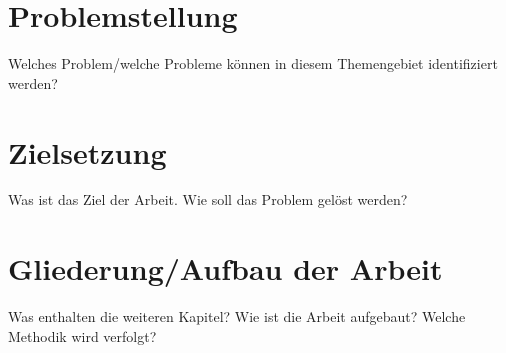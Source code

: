 \section{Problemstellung}
\label{ch:Einleitung:sec:Problemstellung}

Welches Problem/welche Probleme können in diesem Themengebiet identifiziert werden?

\section{Zielsetzung}
\label{ch:Einleitung:sec:Zielsetzung}

Was ist das Ziel der Arbeit. Wie soll das Problem gelöst werden?


\section{Gliederung/Aufbau der Arbeit}
\label{ch:Einleitung:sec:Gliederung}

Was enthalten die weiteren Kapitel? Wie ist die Arbeit aufgebaut? Welche Methodik wird verfolgt?



